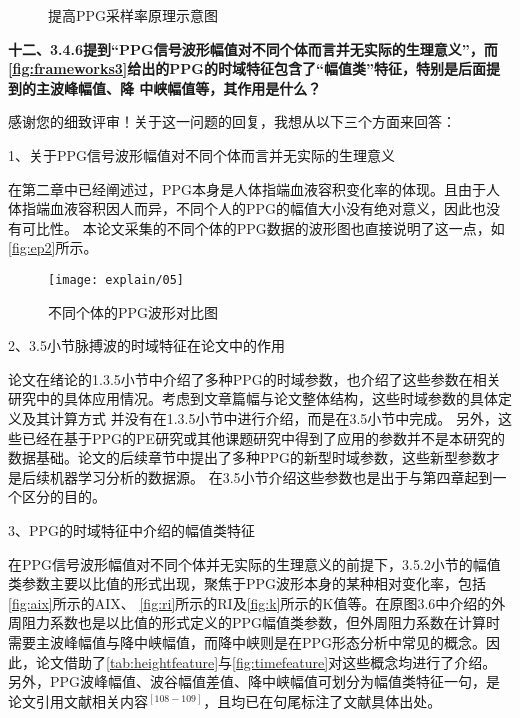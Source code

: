 \begin{figure}[htbp]
    \centering
    \quad
    \quad
    \quad
    \caption[]{\label{fig:ep1}提高PPG采样率原理示意图}
\end{figure}

\textbf{十二、3.4.6提到“PPG信号波形幅值对不同个体而言并无实际的生理意义”，而\autoref{fig:frameworks3}给出的PPG的时域特征包含了“幅值类”特征，特别是后面提到的主波峰幅值、降
中峡幅值等，其作用是什么？}

感谢您的细致评审！关于这一问题的回复，我想从以下三个方面来回答：

1、关于PPG信号波形幅值对不同个体而言并无实际的生理意义

在第二章中已经阐述过，PPG本身是人体指端血液容积变化率的体现。且由于人体指端血液容积因人而异，不同个人的PPG的幅值大小没有绝对意义，因此也没有可比性。
本论文采集的不同个体的PPG数据的波形图也直接说明了这一点，如\autoref{fig:ep2}所示。
\begin{figure}[htbp]
    \centering
    \texttt{[image: explain/05]}
    \caption[]{\label{fig:ep2}不同个体的PPG波形对比图}
\end{figure}

2、3.5小节脉搏波的时域特征在论文中的作用

论文在绪论的1.3.5小节中介绍了多种PPG的时域参数，也介绍了这些参数在相关研究中的具体应用情况。考虑到文章篇幅与论文整体结构，这些时域参数的具体定义及其计算方式
并没有在1.3.5小节中进行介绍，而是在3.5小节中完成。
另外，这些已经在基于PPG的PE研究或其他课题研究中得到了应用的参数并不是本研究的数据基础。论文的后续章节中提出了多种PPG的新型时域参数，这些新型参数才是后续机器学习分析的数据源。
在3.5小节介绍这些参数也是出于与第四章起到一个区分的目的。

3、PPG的时域特征中介绍的幅值类特征

在PPG信号波形幅值对不同个体并无实际的生理意义的前提下，3.5.2小节的幅值类参数主要以比值的形式出现，聚焦于PPG波形本身的某种相对变化率，包括\autoref{fig:aix}所示的AIX、
\autoref{fig:ri}所示的RI及\autoref{fig:k}所示的K值等。在原图3.6中介绍的外周阻力系数也是以比值的形式定义的PPG幅值类参数，但外周阻力系数在计算时
需要主波峰幅值与降中峡幅值，而降中峡则是在PPG形态分析中常见的概念。因此，论文借助了\autoref{tab:heightfeature}与\autoref{fig:timefeature}对这些概念均进行了介绍。
另外，PPG波峰幅值、波谷幅值差值、降中峡幅值可划分为幅值类特征一句，是论文引用文献相关内容$^{[108-109]}$，且均已在句尾标注了文献具体出处。

